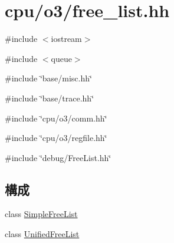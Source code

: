 \hypertarget{free__list_8hh}{
\section{cpu/o3/free\_\-list.hh}
\label{free__list_8hh}
}
{\ttfamily \#include $<$iostream$>$}\par
{\ttfamily \#include $<$queue$>$}\par
{\ttfamily \#include \char`\"{}base/misc.hh\char`\"{}}\par
{\ttfamily \#include \char`\"{}base/trace.hh\char`\"{}}\par
{\ttfamily \#include \char`\"{}cpu/o3/comm.hh\char`\"{}}\par
{\ttfamily \#include \char`\"{}cpu/o3/regfile.hh\char`\"{}}\par
{\ttfamily \#include \char`\"{}debug/FreeList.hh\char`\"{}}\par
\subsection*{構成}
\begin{DoxyCompactItemize}
\item 
class \hyperlink{classSimpleFreeList}{SimpleFreeList}
\item 
class \hyperlink{classUnifiedFreeList}{UnifiedFreeList}
\end{DoxyCompactItemize}
